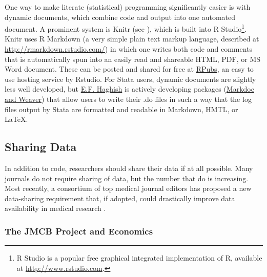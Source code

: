 \documentclass[12pt] {article}
\begin{document}
One way to make literate (statistical) programming significantly easier
is with dynamic documents, which combine code and output into one automated document. A prominent system is Knitr (see \cite{xie_dynamic_2013, xie_knitr:_2014}), which is built into R
Studio\footnote{R Studio is a popular free graphical integrated implementation of
  R, available at \href{stylesWithEffects.xml}{http://www.rstudio.com}.}.
Knitr uses R Markdown (a very simple plain text markup language,
described at \url{http://rmarkdown.rstudio.com/}) in which one writes
both code and comments that is automatically spun into an easily read
and shareable HTML, PDF, or MS Word document. These can be posted and
shared for free at \href{https://rpubs.com}{RPubs}, an easy to use
hosting service by Rstudio. For Stata users, dynamic documents are slightly less well developed, but \href{http://www.haghish.com}{E.F. Haghish} is actively developing packages (\href{http://www.haghish.com/statistics/stata-blog/reproducible-research/packages.php}{Markdoc and Weaver}) that allow users to write their .do files in such a way that the log files output by Stata are formatted and readable in Markdown, HMTL, or \LaTeX . 


\subsection{Sharing Data}\label{sharing-data}

In addition to code, researchers should share their data if at all
possible. Many journals do not require sharing of data, but the number
that do is increasing. Most recently, a consortium of top medical journal editors has proposed a new data-sharing requirement that, if adopted, could drastically improve data availability in medical research \citep{ICMJEData}.

\subsubsection{The JMCB Project and
Economics}\label{the-jmcb-project-and-economics}
\end{document}
